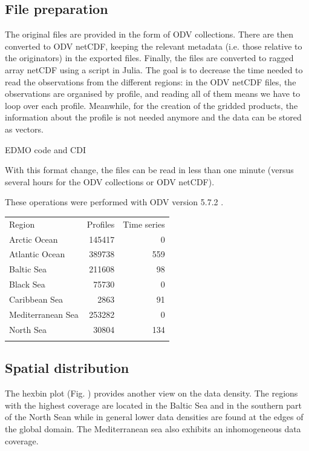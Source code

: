 \documentclass[essd, manuscript]{copernicus}
\begin{document}
\subsection{File preparation}

The original files are provided in the form of ODV \citep[Ocean Data View,][]{SCHLITZER2002} collections. There are then converted to ODV netCDF, keeping the relevant metadata (i.e. those relative to the originators) in the exported files. Finally, the files are converted to ragged array netCDF using a script in Julia. The goal is to decrease the time needed to read the observations from the different regions: in the ODV netCDF files, the observations are organised by profile, and reading all of them means we have to loop over each profile. Meanwhile, for the creation of the gridded products, the information about the profile is not needed anymore and the data can be stored as vectors.

EDMO code and CDI \citep{Schaap2010}

With this format change, the files can be read in less than one minute (versus several hours for the ODV collections or ODV netCDF).

These operations were performed with ODV version 5.7.2 \citep{Schlitzer2024}.

\begin{table}
\begin{tabular}{lrr}
\tophline
Region			& Profiles		& Time series	\\
\middlehline
Arctic Ocean		& 145417			& 0				\\
Atlantic	 Ocean	& 389738			& 559			\\
Baltic Sea		& 211608			& 98				\\
Black Sea		& 75730			& 0				\\
Caribbean Sea	& 2863			& 91				\\
Mediterranean Sea & 253282		& 0				\\
North Sea		& 30804			& 134			\\
\bottomhline
\end{tabular}
\end{table}
 

\subsection{Spatial distribution}

The hexbin plot (Fig. ) provides another view on the data density. The regions with the highest coverage are located in the Baltic Sea and in the southern part of the North Sean while in general lower data densities are found at the edges of the global domain. The Mediterranean sea also exhibits an inhomogeneous data coverage. 
\end{document}
